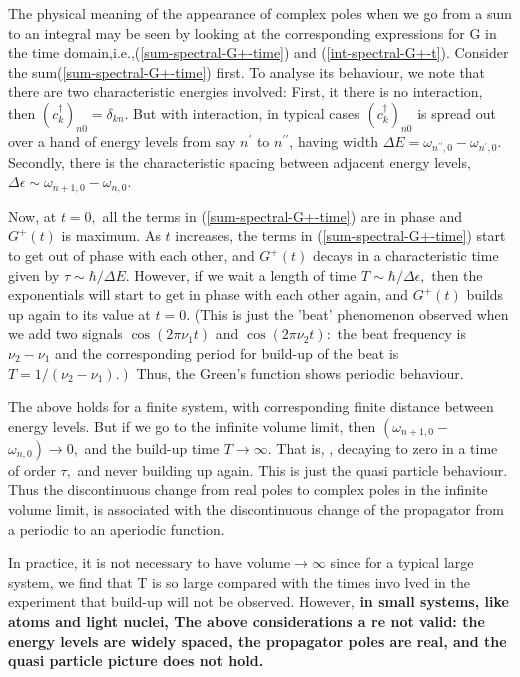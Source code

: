 The physical meaning of the appearance of complex poles when we go from a sum to an integral may be seen by looking at the corresponding expressions for G in the time domain,i.e.,(\ref{sum-spectral-G+-time}) and (\ref{int-spectral-G+-t}). Consider the sum(\ref{sum-spectral-G+-time}) first. To analyse its behaviour, we note that there are two characteristic energies involved: First, it there is no interaction, then $(c^{\dagger}_k)_{n0}=\delta_{kn}$. But with interaction, in typical cases $(c^{\dagger}_k)_{n0}$ is spread out over a hand of energy levels from say $n^{\prime}$ to $n^{\prime\prime}$, having width $\Delta E=\omega_{n^{\prime\prime},0}-\omega_{n^{\prime},0}$. Secondly, there is the characteristic spacing between adjacent energy levels, $\Delta \epsilon \sim \omega_{n+1,0}-\omega_{n, 0}$.

Now, at $t=0,$ all the terms in (\ref{sum-spectral-G+-time}) are in phase and $G^{+}(t)$ is maximum. As $t$ increases, the terms in (\ref{sum-spectral-G+-time}) start to get out of phase with each other, and $G^{+}(t)$ decays in a characteristic time given by $\tau \sim \hbar / \Delta E .$ However, if we wait a length of time $T \sim \hbar / \Delta \epsilon,$ then the exponentials will start to get in phase with each other again, and $G^{+}(t)$ builds up again to its value at $t=0 .$ (This is just the 'beat' phenomenon observed when we add two signals $\cos \left(2 \pi \nu_{1} t\right)$ and $\cos \left(2 \pi \nu_{2} t\right):$ the beat frequency is $\nu_{2}-\nu_{1}$ and the corresponding period for build-up of the beat is $\left.T=1 /\left(\nu_{2}-\nu_{1}\right) .\right)$ Thus, the Green's function shows periodic behaviour.

The above holds for a finite system, with corresponding finite distance between energy levels. But if we go to the infinite volume limit, then $\left(\omega_{n+1,0}-\right.$ $\left.\omega_{n, 0}\right) \rightarrow 0,$ and the build-up time $T \rightarrow \infty .$ That is, , decaying to zero in a time of order $\tau,$ and never building up again. This is just the quasi particle behaviour. Thus the discontinuous change from real poles to complex poles in the infinite volume limit, is associated with the discontinuous change of the propagator from a periodic to an aperiodic function.

In practice, it is not necessary to have volume$\rightarrow\infty$ since for a typical large system, we find that T is so large compared with the times invo lved in the experiment that build-up will not be observed. However, \textbf{in small systems, like atoms and light nuclei, The above considerations a re not valid: the energy levels are widely spaced, the propagator poles are real, and the quasi particle picture does not hold.}